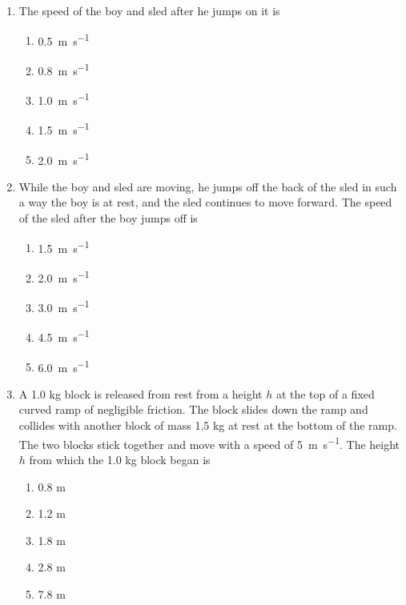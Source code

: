 \documentclass{../../../oss-apphys}
\begin{document}
\begin{multicols*}{2}
  \begin{enumerate}[resume,leftmargin=18pt]
  \item The speed of the boy and sled after he jumps on it is
    \label{boy1}
    \begin{enumerate}[nosep,leftmargin=18pt,label=(\Alph*)]
    \item\SI{0.5}{\metre\per\second}
    \item\SI{0.8}{\metre\per\second}
    \item\SI{1.0}{\metre\per\second}
    \item\SI{1.5}{\metre\per\second}
    \item\SI{2.0}{\metre\per\second}
    \end{enumerate}
    
  \item While the boy and sled are moving, he jumps off the back of the sled in
    such a way the boy is at rest, and the sled continues to move forward.
    The speed of the sled after the boy jumps off is
    \label{boy2}
    \begin{enumerate}[nosep,leftmargin=18pt,label=(\Alph*)]
    \item\SI{1.5}{\metre\per\second}
    \item\SI{2.0}{\metre\per\second}
    \item\SI{3.0}{\metre\per\second}
    \item\SI{4.5}{\metre\per\second}
    \item\SI{6.0}{\metre\per\second}
    \end{enumerate}
    \columnbreak
    
  \item A 1.0 kg block is released from rest from a height $h$ at the top of a
    fixed curved ramp of negligible friction. The block slides down the
    ramp and collides with another block of mass 1.5 kg at rest at the
    bottom of the ramp. The two blocks stick together and move with a
    speed of \SI{5}{\metre\per\second}. The height $h$ from which the 1.0 kg
    block began is
    \begin{enumerate}[nosep,leftmargin=18pt,label=(\Alph*)]
    \item 0.8 m
    \item 1.2 m
    \item 1.8 m
    \item 2.8 m
    \item 7.8 m
    \end{enumerate}


\end{enumerate}
\end{multicols*}
\end{document}
